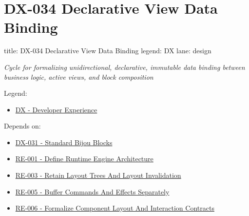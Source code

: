 \chapter{DX-034 Declarative View Data Binding}\label{record-132}

\smallskip

\begin{RecordMeta}
title: DX-034 Declarative View Data Binding
legend: DX
lane: design

\end{RecordMeta}

\emph{Cycle for formalizing unidirectional, declarative, immutable data binding between business logic, active views, and block composition}

Legend:

\begin{itemize}
\tightlist
\item
  \href{https://github.com/flyingrobots/bijou/blob/1853ad902f6bf219326409e7f743a5a1d6517dbc/docs/legends/DX-developer-experience.md}{DX - Developer Experience}
\end{itemize}

Depends on:

\begin{itemize}
\tightlist
\item
  \href{https://github.com/flyingrobots/bijou/blob/cbd70612140e7a450d764b3c7be1c6af878b99bc/docs/design/DX-031-standard-bijou-blocks.md}{DX-031 - Standard Bijou Blocks}
\item
  \href{https://github.com/flyingrobots/bijou/blob/cbd70612140e7a450d764b3c7be1c6af878b99bc/docs/design/RE-001-define-runtime-engine-architecture.md}{RE-001 - Define Runtime Engine Architecture}
\item
  \href{https://github.com/flyingrobots/bijou/blob/cbd70612140e7a450d764b3c7be1c6af878b99bc/docs/design/RE-003-retain-layout-trees-and-layout-invalidation.md}{RE-003 - Retain Layout Trees And Layout Invalidation}
\item
  \href{https://github.com/flyingrobots/bijou/blob/cbd70612140e7a450d764b3c7be1c6af878b99bc/docs/design/RE-005-buffer-commands-and-effects-separately.md}{RE-005 - Buffer Commands And Effects Separately}
\item
  \href{https://github.com/flyingrobots/bijou/blob/cbd70612140e7a450d764b3c7be1c6af878b99bc/docs/design/RE-006-formalize-component-layout-and-interaction-contracts.md}{RE-006 - Formalize Component Layout And Interaction Contracts}
\end{itemize}

